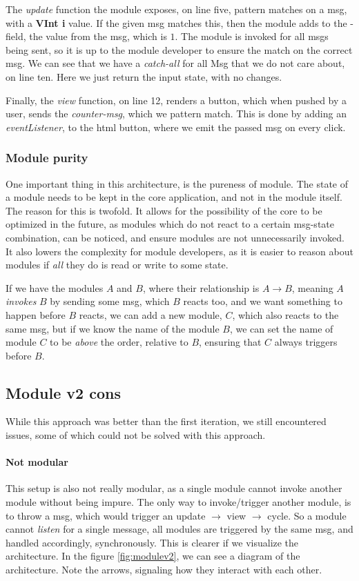 The \textit{update} function the module exposes, on line five, pattern matches
on a  msg, with a \textbf{VInt i} value. If the given msg matches
this, then the module adds to the -field, the value from the msg,
which is $1$. The module is invoked for all msgs being sent, so it is up to the
module developer to ensure the match on the correct msg. We can see that we
have a \textit{catch-all} for all Msg that we do not care about, on line ten.
Here we just return the input state, with no changes.

Finally, the \textit{view} function, on line 12, renders a button, which when pushed by a
user, sends the \textit{counter-msg}, which we pattern match. This is done by
adding an \textit{eventListener}, to the \gls*{html} button, where we emit the
passed msg on every click.


\subsubsection{Module purity}

One important thing in this architecture, is the pureness of module. The state
of a module needs to be kept in the core application, and not in the module
itself. The reason for this is twofold. It allows for the possibility of the
core to be optimized in the future, as modules which do not react to a certain
msg-state combination, can be noticed, and ensure modules are not unnecessarily
invoked. It also lowers the complexity for module developers, as it is easier to
reason about modules if \textit{all} they do is read or write to some state.

If we have the modules $A$ and $B$, where their relationship is $A \to B$,
meaning $A$ \textit{invokes} $B$ by sending some msg, which $B$ reacts too, and
we want something to happen before $B$ reacts, we can add a new module, $C$,
which also reacts to the same msg, but if we know the name of the module $B$,
we can set the name of module $C$ to be \textit{above} the order, relative to
$B$, ensuring that $C$ always triggers before $B$.


\subsection{Module v2 cons}

While this approach was better than the first iteration, we still encountered
issues, some of which could not be solved with this approach.

\paragraph{Not modular} This setup is also not really modular, as a single
module cannot invoke another module without being impure. The only way to
invoke/trigger another module, is to throw a msg, which would trigger an update
$\to$ view $\to$ cycle. So a module cannot \textit{listen} for a single message,
all modules are triggered by the same msg, and handled accordingly,
synchronously. This is clearer if we visualize the architecture. In the figure
\ref{fig:modulev2}, we can see a diagram of the architecture. Note the arrows,
signaling how they interact with each other.

